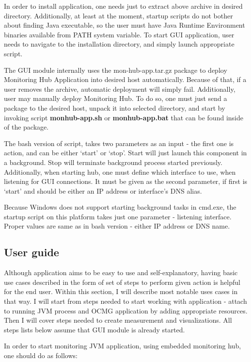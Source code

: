 In order to install application, one needs just to extract above archive in desired directory. Additionally, at least at the moment, startup scripts do not bother about finding Java executable, so the user must have Java Runtime Environment binaries available from PATH system variable. To start GUI application, user needs to navigate to the installation directory, and simply launch appropriate script.

The GUI module internally uses the mon-hub-app.tar.gz package to deploy Monitoring Hub Application into desired host automatically. Because of that, if a user removes the archive, automatic deployment will simply fail. Additionally, user may manually deploy Monitoring Hub. To do so, one must just send a package to the desired host, unpack it into selected directory, and start by invoking script {\bf monhub-app.sh} or {\bf monhub-app.bat} that can be found inside of the package.

The bash version of script, takes two parameters as an input - the first one is action, and can be either \lq{}start\rq{} or \lq{}stop\rq{}. Start will just launch this component in a background. Stop will terminate background process started previously. Additionally, when starting hub, one must define which interface to use, when listening for GUI connections. It must be given as the second parameter, if first is \lq{}start\rq{} and should be either an IP address or interface\rq{}s DNS alias.

Because Windows does not support starting background tasks in cmd.exe, the startup script on this platform takes just one parameter - listening interface. Proper values are same as in bash version - either IP address or DNS name.

\subsection{User guide}

Although application aims to be easy to use and self-explanatory, having basic use cases described in the form of set of steps to perform given action is helpful for the end user. Within this section, I will describe most notable uses cases in that way. I will start from steps needed to start working with application - attach to running JVM process and OCMG application by adding appropriate resources. Then I will cover steps needed to create measurement and visualizations. All steps lists below assume that GUI module is already started.

In order to start monitoring JVM application, using embedded monitoring hub, one should do as follows:

